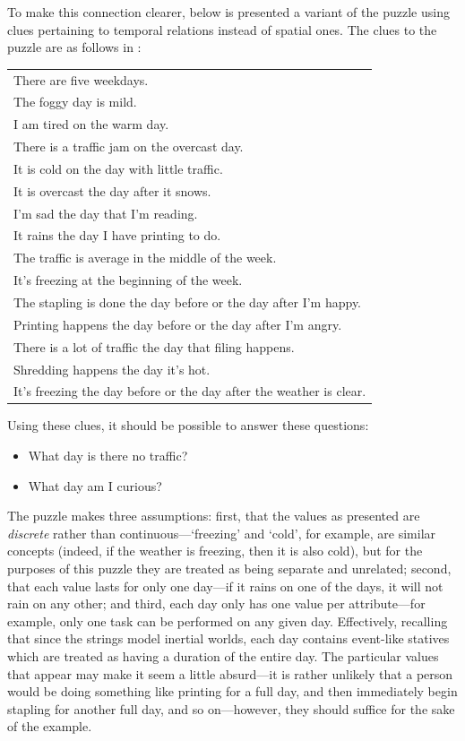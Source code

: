 \documentclass[a4paper,12pt,leqno,twoside]{article}
\begin{document}
To make this connection clearer, below is presented a variant of the puzzle using clues pertaining to temporal relations instead of spatial ones. The clues to the puzzle are as follows in :
\begin{center}
	\begin{tabular}[h!]{|l|}
		\hline
		There are five weekdays.\\
		The foggy day is mild.\\
		I am tired on the warm day.\\
		There is a traffic jam on the overcast day.\\
		It is cold on the day with little traffic.\\
		It is overcast the day after it snows.\\
		I'm sad the day that I'm reading.\\
		It rains the day I have printing to do.\\
		The traffic is average in the middle of the week.\\
		It's freezing at the beginning of the week.\\
		The stapling is done the day before or the day after I'm happy.\\
		Printing happens the day before or the day after I'm angry.\\
		There is a lot of traffic the day that filing happens.\\
		Shredding happens the day it's hot.\\
		It's freezing the day before or the day after the weather is clear.\\
		\hline
	\end{tabular}
	\label{tab:temporal-zebra-clues}
\end{center}
Using these clues, it should be possible to answer these questions:
\begin{itemize}
	\item What day is there no traffic?
	\item What day am I curious? 
\end{itemize}
The puzzle makes three assumptions: first, that the values as presented are \textit{discrete} rather than continuous---`freezing' and `cold', for example, are similar concepts (indeed, if the weather is freezing, then it is also cold), but for the purposes of this puzzle they are treated as being separate and unrelated; second, that each value lasts for only one day---if it rains on one of the days, it will not rain on any other; and third, each day only has one value per attribute---for example, only one task can be performed on any given day. Effectively, recalling that since the strings model inertial worlds, each day contains event-like statives which are treated as having a duration of the entire day. The particular values that appear may make it seem a little absurd---it is rather unlikely that a person would be doing something like printing for a full day, and then immediately begin stapling for another full day, and so on---however, they should suffice for the sake of the example.
\end{document}
